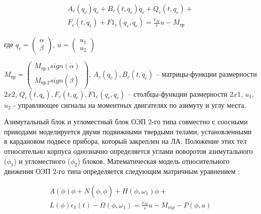 \begin{equation}
\label{eq:p2:6-}
\begin{alignedat}{2}
A_c\left(q_c\right){\ddot{q}}_c+B_c\left(t,q_c\right){\dot{q}}_c+Q_c\left(t,q_c\right)+\\
F_c\left(t,q_c\right)+F1_c\left(q_c,{\dot{q}}_c\right)=\frac{c_M}{r}u-M_{\textit{тр}}
\end{alignedat}
\end{equation}

где
$q_c=\left(\begin{array}{cc}
\alpha{} \\
\beta{}
\end{array}\right)$,      
$u=\left(\begin{array}{
	cc}
u_1 \\
u_2
\end{array}\right)$

$M_{\textit{тр}}=\left(\begin{array}{
		cc}
	M_{\textit{тр.1}}sign\left(\dot{\alpha{}}\right) \\
	M_{\textit{тр.2}}sign\left(\dot{\beta{}}\right)
\end{array}\right)$, 
$A_c\left(q_c\right),B_c\left(t,q_c\right)$ – матрицы-функции  размерности $2x2$,
$Q_c\left(t,q_c\right),F_c\left(t,q_c\right),F1_c\left(q_c,{\dot{q}}_c\right)$ – столбцы-функции размерности $2x1$,
$u_1$, $u_2$ - управляющее сигналы на моментных двигателях по азимуту и углу места. 

Азимутальный блок и угломестный блок ОЭП 2-го типа совместно с соосными приводами моделируется двумя подвижными твердыми телами, установленными в кардановом подвесе прибора, который закреплен на ЛА. Положение этих тел относительно корпуса однозначно определяется углами поворотов азимутального ($\phi_1$) и угломестного ($\phi_2$) блоков. Математическая модель относительного движения ОЭП 2-го типа определяется следующим матричным уравнением \cite[]{Baloev16}:

\begin{equation}
\label{eq:p2:7-}
\begin{alignedat}{2}
A\left(\phi{}\right)\ddot{\phi{}}+N\left(\phi{},\dot{\phi{}}\right)+H\left(\phi{},{\omega{}}_1\right)\dot{\phi{}}+\\
L\left(\phi{}\right){\epsilon{}}_1(t)-\Omega{}\left(\phi{},{\omega{}}_1\right)=\frac{c_M}{r}u-M_{mp}-P\left(\phi{},a\right)
\end{alignedat}
\end{equation}

